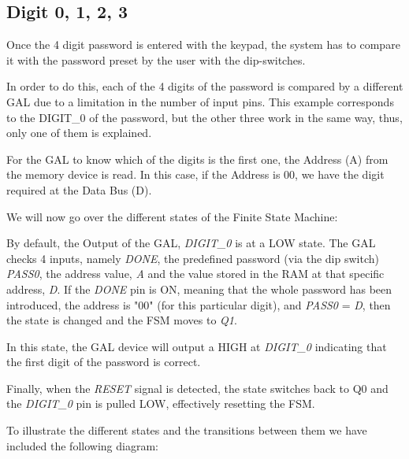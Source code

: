 \subsection{Digit 0, 1, 2, 3}
\label{sec:IND_CHECK}

Once the 4 digit password is entered with the keypad, the system has to compare it with the password preset by the user with the dip-switches.

\medskip

In order to do this, each of the 4 digits of the password is compared by a different GAL due to a limitation in the number of input pins. This example corresponds to the DIGIT\_0 of the password, but the other three work in the same way, thus, only one of them is explained. 

\medskip

For the GAL to know which of the digits is the first one, the Address (A) from the memory device is read. In this case, if the Address is $00$, we have the digit required at the Data Bus (D).\medskip

We will now go over the different states of the Finite State Machine: \medskip

\medskip
\textit{}
\medskip

By default, the Output of the GAL, \textit{DIGIT\_0} is at a LOW state. The GAL checks 4 inputs, namely \textit{DONE}, the predefined password (via the dip switch) \textit{PASS0}, the address value, \textit{A} and the value stored in the RAM at that specific address, \textit{D}. If the \textit{DONE} pin is ON, meaning that the whole password has been introduced, the address is "00" (for this particular digit), and \textit{PASS0} = \textit{D}, then the state is changed and the FSM moves to \textit{Q1}.\medskip

\textit{}
\medskip

In this state, the GAL device will output a HIGH at \textit{DIGIT\_0} indicating that the first digit of the password is correct. \medskip

Finally, when the \textit{RESET} signal is detected, the state switches back to Q0 and the \textit{DIGIT\_0} pin is pulled LOW, effectively resetting the FSM. \medskip

To illustrate the different states and the transitions between them we have included the following diagram:

